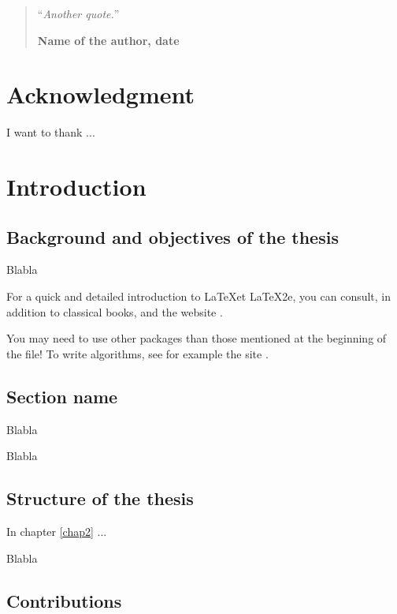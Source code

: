 \documentclass[11pt,a4paper,oneside]{book}
\begin{document}
\medskip

\begin{quotation}
\noindent ``\emph{Another quote.}''
\begin{flushright}\textbf{Name of the author, date}\end{flushright}
\end{quotation}
\chapter*{Acknowledgment}
\thispagestyle{empty} 

\noindent I want to thank ...

\thispagestyle{empty} 
\setcounter{page}{0}
\tableofcontents
\mainmatter 
\chapter{Introduction}
\setcounter{page}{1}

\vspace*{0.5cm}

\section{Background and objectives of the thesis}

Blabla

For a quick and detailed introduction to  \LaTeX et \LaTeX2e, you can consult, in addition to classical books, \cite{lamp,mittel} and the website \cite{oetik}.

You may need to use other packages than those mentioned at the beginning of the file! To write algorithms, see for example the site \cite{fiorio}.

\section{Section name}

Blabla

Blabla

\section{Structure of the thesis}

In chapter \ref{chap2} ...

Blabla

\section{Contributions}
\end{document}
